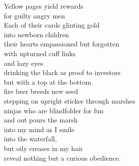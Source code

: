 Yellow pages yield rewards\\
for guilty angry men\\
Each of their cards glinting gold\\
into newborn children\\
their hearts empassioned but forgotten\\
with upturned cuff links\\
and lazy eyes\\
drinking the black as proof to investors\\
but with a top at the bottom\\
fire beer breeds new seed\\
stepping on upright stickes through marshes\\
ninjas who are blindfolder for fun\\
and out pours the marsh\\
into my mind as I smile\\
into the waterfall,\\
but oily creases in my hair\\
reveal nothing but a curious obedience.\\


